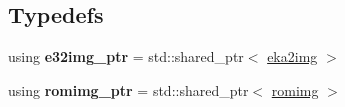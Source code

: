 \subsection*{Typedefs}
\begin{DoxyCompactItemize}
\item 
\mbox{\label{namespaceeka2l1_1_1loader_aee66abebbddf283626eb3634bb3f438a}} 
using {\bfseries e32img\+\_\+ptr} = std\+::shared\+\_\+ptr$<$ \mbox{\hyperlink{structeka2l1_1_1loader_1_1eka2img}{eka2img}} $>$
\item 
\mbox{\label{namespaceeka2l1_1_1loader_a2143a0ac0268c0bf75e7bf05f8858b12}} 
using {\bfseries romimg\+\_\+ptr} = std\+::shared\+\_\+ptr$<$ \mbox{\hyperlink{structeka2l1_1_1loader_1_1romimg}{romimg}} $>$
\end{DoxyCompactItemize}
